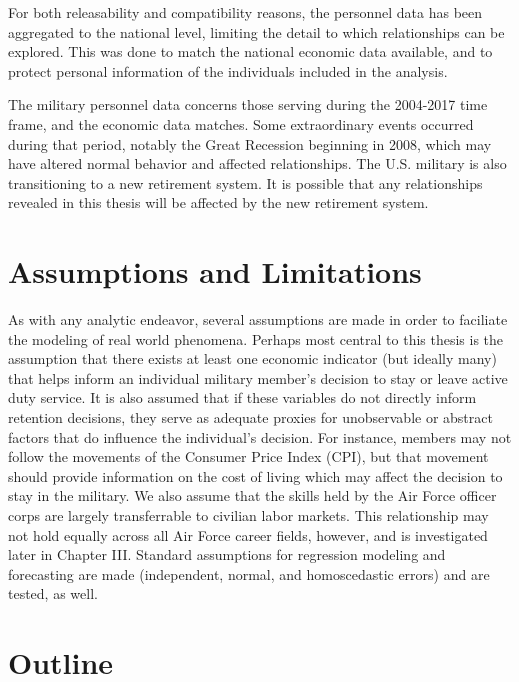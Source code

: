\documentclass[12pt,letterpaper,toc=flat,oneside]{report}
\theoremstyle{definition}
\theoremstyle{definition}
\theoremstyle{definition}
\theoremstyle{remark}
\begin{document}
For both releasability and compatibility reasons, the personnel data has
been aggregated to the national level, limiting the detail to which
relationships can be explored. This was done to match the national
economic data available, and to protect personal information of the
individuals included in the analysis.

The military personnel data concerns those serving during the 2004-2017
time frame, and the economic data matches. Some extraordinary events
occurred during that period, notably the Great Recession beginning in
2008, which may have altered normal behavior and affected relationships.
The U.S. military is also transitioning to a new retirement system. It
is possible that any relationships revealed in this thesis will be
affected by the new retirement system.

\hypertarget{assumptions-and-limitations}{%
\section{Assumptions and
Limitations}\label{assumptions-and-limitations}}

As with any analytic endeavor, several assumptions are made in order to
faciliate the modeling of real world phenomena. Perhaps most central to
this thesis is the assumption that there exists at least one economic
indicator (but ideally many) that helps inform an individual military
member's decision to stay or leave active duty service. It is also
assumed that if these variables do not directly inform retention
decisions, they serve as adequate proxies for unobservable or abstract
factors that do influence the individual's decision. For instance,
members may not follow the movements of the Consumer Price Index (CPI),
but that movement should provide information on the cost of living which
may affect the decision to stay in the military. We also assume that the
skills held by the Air Force officer corps are largely transferrable to
civilian labor markets. This relationship may not hold equally across
all Air Force career fields, however, and is investigated later in
Chapter III. Standard assumptions for regression modeling and
forecasting are made (independent, normal, and homoscedastic errors) and
are tested, as well.

\hypertarget{outline}{%
\section{Outline}\label{outline}}
\end{document}
